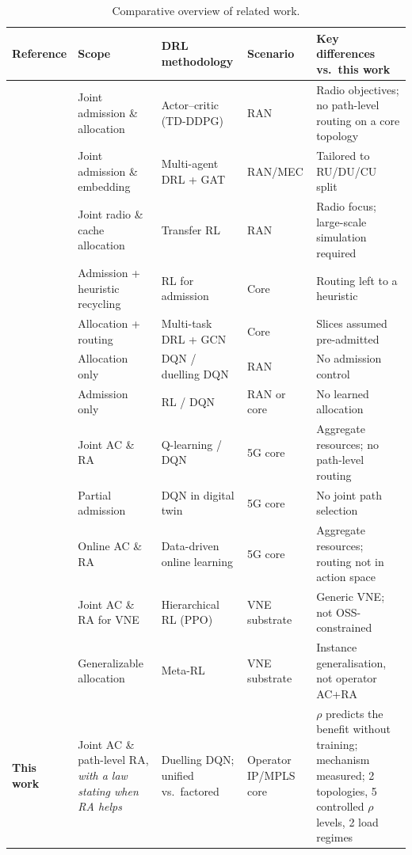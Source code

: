\documentclass[10pt,journal,comsoc]{IEEEtran}
\begin{document}
\begin{table}[t]
\caption{Comparative overview of related work.}
\centering
\renewcommand{\arraystretch}{1.2}
\begin{tabular}{>{\raggedright\arraybackslash}m{1.7cm}
                >{\raggedright\arraybackslash}m{3.9cm}
                >{\raggedright\arraybackslash}m{2.6cm}
                >{\raggedright\arraybackslash}m{1.8cm}
                >{\raggedright\arraybackslash}m{5.6cm}}
\toprule
\textbf{Reference} & \textbf{Scope} & \textbf{DRL methodology} & \textbf{Scenario} & \textbf{Key differences vs.\ this work} \\
\midrule
\cite{Rezazadeh2021ZerotouchCN,9322237} & Joint admission \& allocation & Actor--critic (TD-DDPG) & RAN & Radio objectives; no path-level routing on a core topology \\
\cite{9953137} & Joint admission \& embedding & Multi-agent DRL + GAT & RAN/MEC & Tailored to RU/DU/CU split \\
\cite{zhou2022learning} & Joint radio \& cache allocation & Transfer RL & RAN & Radio focus; large-scale simulation required \\
\cite{li2023reinforcement} & Admission + heuristic recycling & RL for admission & Core & Routing left to a heuristic \\
\cite{9655323} & Allocation + routing & Multi-task DRL + GCN & Core & Slices assumed pre-admitted \\
\cite{kim2019reinforcement,van2019optimal,abiko2020flexible} & Allocation only & DQN / duelling DQN & RAN & No admission control \\
\cite{sciancalepore2019rl,10293471,9771643,Tao_2025} & Admission only & RL / DQN & RAN or core & No learned allocation \\
\cite{villota2022admission} & Joint AC \& RA & Q-learning / DQN & 5G core & Aggregate resources; no path-level routing \\
\cite{wang2024fsac} & Partial admission & DQN in digital twin & 5G core & No joint path selection \\
\cite{sulaiman2025datadriven} & Online AC \& RA & Data-driven online learning & 5G core & Aggregate resources; routing not in action space \\
\cite{xiong2024hrlacra} & Joint AC \& RA for VNE & Hierarchical RL (PPO) & VNE substrate & Generic VNE; not OSS-constrained \\
\cite{wang2024flagvne} & Generalizable allocation & Meta-RL & VNE substrate & Instance generalisation, not operator AC+RA \\
\midrule
\textbf{This work} & Joint AC \& path-level RA, \emph{with a law stating when RA helps} & Duelling DQN; unified vs.\ factored & Operator IP/MPLS core & $\rho$ predicts the benefit without training; mechanism measured; 2 topologies, 5 controlled $\rho$ levels, 2 load regimes \\
\bottomrule
\end{tabular}
\label{tab:related_work_comparison}
\end{table}
\end{document}

